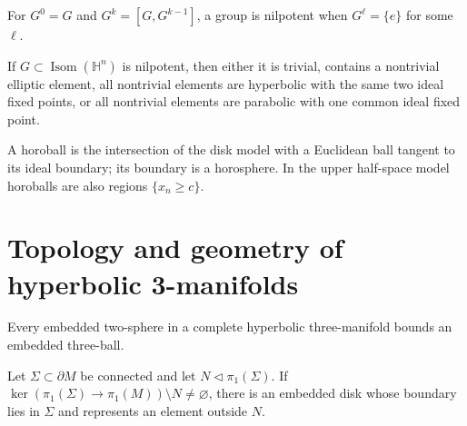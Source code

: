\begin{definition}
\label{def:chow-iv-nilpotent-group}
For \(G^0=G\) and \(G^k=[G,G^{k-1}]\), a group is nilpotent when
\(G^\ell=\{e\}\) for some \(\ell\).
\end{definition}

\begin{lemma}
\label{lem:chow-iv-nilpotent-isometry-subgroups}
If \(G\subset\operatorname{Isom}(\mathbb H^n)\) is nilpotent, then either it is
trivial, contains a nontrivial elliptic element, all nontrivial elements are
hyperbolic with the same two ideal fixed points, or all nontrivial elements are
parabolic with one common ideal fixed point.
\end{lemma}

\begin{definition}
\label{def:chow-iv-horoball}
A horoball is the intersection of the disk model with a Euclidean ball tangent
to its ideal boundary; its boundary is a horosphere.  In the upper half-space
model horoballs are also regions \(\{x_n\ge c\}\).
\end{definition}

\section{Topology and geometry of hyperbolic 3-manifolds}

\begin{lemma}
\label{lem:chow-iv-hyperbolic-irreducible}
Every embedded two-sphere in a complete hyperbolic three-manifold bounds an
embedded three-ball.
\end{lemma}

\begin{theorem}
\label{thm:chow-iv-loop-theorem}
Let \(\Sigma\subset\partial M\) be connected and let \(N\lhd\pi_1(\Sigma)\).
If \(\ker(\pi_1(\Sigma)\to\pi_1(M))\setminus N\ne\varnothing\), there is an
embedded disk whose boundary lies in \(\Sigma\) and represents an element
outside \(N\).
\end{theorem}

